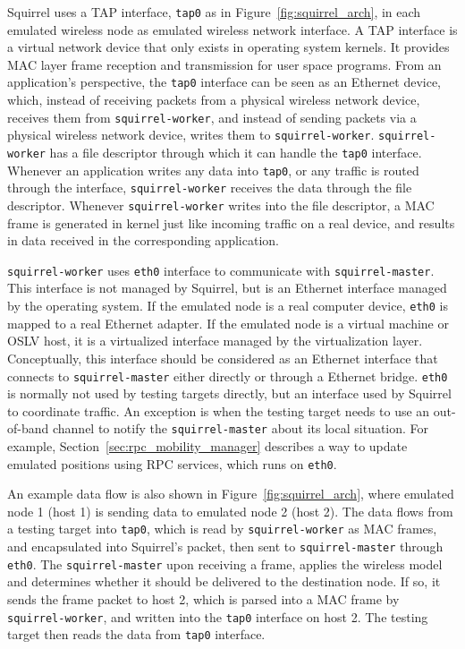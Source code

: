 \documentclass[12pt]{report}
\begin{document}
Squirrel uses a TAP\cite{tuntap2002} interface, \texttt{tap0} as in Figure~\ref{fig:squirrel_arch}, in each emulated wireless node as emulated wireless network interface. A TAP interface is a virtual network device that only exists in operating system kernels. It provides MAC layer frame reception and transmission for user space programs. From an application's perspective, the \texttt{tap0} interface can be seen as an Ethernet device, which, instead of receiving packets from a physical wireless network device, receives them from \texttt{squirrel-worker}, and instead of sending packets via a physical wireless network device, writes them to \texttt{squirrel-worker}. \texttt{squirrel-worker} has a file descriptor through which it can handle the \texttt{tap0} interface. Whenever an application writes any data into \texttt{tap0}, or any traffic is routed through the interface, \texttt{squirrel-worker} receives the data through the file descriptor. Whenever \texttt{squirrel-worker} writes into the file descriptor, a MAC frame is generated in kernel just like incoming traffic on a real device, and results in data received in the corresponding application.

\texttt{squirrel-worker} uses \texttt{eth0} interface to communicate with \texttt{squirrel-master}. This interface is not managed by Squirrel, but is an Ethernet interface managed by the operating system. If the emulated node is a real computer device, \texttt{eth0} is mapped to a real Ethernet adapter. If the emulated node is a virtual machine or OSLV host, it is a virtualized interface managed by the virtualization layer. Conceptually, this interface should be considered as an Ethernet interface that connects to \texttt{squirrel-master} either directly or through a Ethernet bridge. \texttt{eth0} is normally not used by testing targets directly, but an interface used by Squirrel to coordinate traffic. An exception is when the testing target needs to use an out-of-band channel to notify the \texttt{squirrel-master} about its local situation. For example, Section~\ref{sec:rpc_mobility_manager} describes a way to update emulated positions using RPC services, which runs on \texttt{eth0}.

An example data flow is also shown in Figure~\ref{fig:squirrel_arch}, where emulated node 1 (host 1) is sending data to emulated node 2 (host 2). The data flows from a testing target into \texttt{tap0}, which is read by \texttt{squirrel-worker} as MAC frames, and encapsulated into Squirrel's packet, then sent to \texttt{squirrel-master} through \texttt{eth0}. The \texttt{squirrel-master} upon receiving a frame, applies the wireless model and determines whether it should be delivered to the destination node. If so, it sends the frame packet to host 2, which is parsed into a MAC frame by \texttt{squirrel-worker}, and written into the \texttt{tap0} interface on host 2. The testing target then reads the data from \texttt{tap0} interface.
\end{document}
